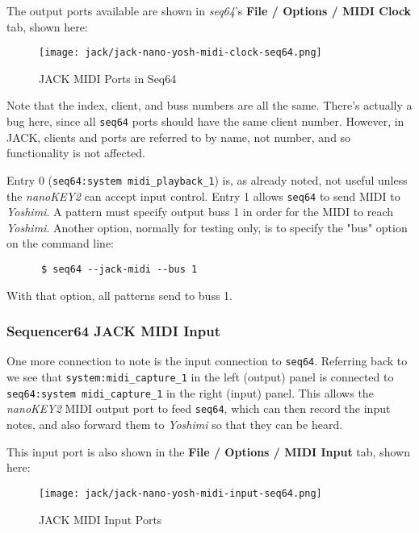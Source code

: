 	The output ports available are shown in \textsl{seq64}'s
	\textbf{File / Options / MIDI Clock} tab, shown here:

\begin{figure}[H]
   \centering 
   \texttt{[image: jack/jack-nano-yosh-midi-clock-seq64.png]}
   \caption{JACK MIDI Ports in Seq64}
   \label{fig:seq64_jack_nano_yosh_midi_clock}
\end{figure}

   Note that the index, client, and buss numbers are all the same.
   There's actually a bug here, since all \texttt{seq64} ports should have the
   same client number.  However, in JACK, clients and ports are referred to by
   name, not number, and so functionality is not affected.

   Entry 0 (\texttt{seq64:system midi\_playback\_1}) is,
   as already noted, not useful unless the \textsl{nanoKEY2} can
   accept input control.  Entry 1 allows \texttt{seq64} to send MIDI
   to \textsl{Yoshimi}.  A pattern must specify output buss 1 in order for the
   MIDI to reach \textsl{Yoshimi}.  Another option, normally for testing only,
   is to specify the "bus" option on the command line:

   \begin{verbatim}
      $ seq64 --jack-midi --bus 1
   \end{verbatim}

   With that option, all patterns send to buss 1.

\subsubsection{Sequencer64 JACK MIDI Input}
\label{subsubsec:seq64_jack_midi_input}

   One more connection to note is the input connection to \texttt{seq64}.
   Referring back to 
   we see that
   \texttt{system:midi\_capture\_1} in the left (output) panel is connected to
   \texttt{seq64:system midi\_capture\_1} in the right (input) panel.
   This allows the \textsl{nanoKEY2} MIDI output port to feed \texttt{seq64},
   which can then record the input notes, and also forward them to
   \textsl{Yoshimi} so that they can be heard.

   This input port is also shown in the \textbf{File / Options / MIDI Input}
   tab, shown here:

\begin{figure}[H]
   \centering 
   \texttt{[image: jack/jack-nano-yosh-midi-input-seq64.png]}
   \caption{JACK MIDI Input Ports}
   \label{fig:seq64_jack_nano_yosh_midi_input}
\end{figure}

